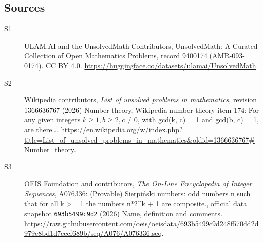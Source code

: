 \documentclass[11pt]{article}
\begin{document}
\subsection{Sources}
\begin{description}
\item[\hypertarget{source:9400174:1}{S1}] ULAM.AI and the UnsolvedMath Contributors, UnsolvedMath: A Curated Collection of Open Mathematics Problems, record 9400174 (AMR-093-0174). CC BY 4.0. \url{https://huggingface.co/datasets/ulamai/UnsolvedMath}.
\item[\hypertarget{source:9400174:2}{S2}] Wikipedia contributors, \emph{List of unsolved problems in mathematics}, revision 1366636767 (2026) Number theory, Wikipedia number-theory item 174: For any given integers $k\geq 1, b\geq 2, c\neq 0$, with gcd(k, c) = 1 and gcd(b, c) = 1, are there…. \url{https://en.wikipedia.org/w/index.php?title=List_of_unsolved_problems_in_mathematics&oldid=1366636767#Number_theory}.
\item[\hypertarget{source:9400174:3}{S3}] OEIS Foundation and contributors, \emph{The On-Line Encyclopedia of Integer Sequences}, A076336: (Provable) Sierpiński numbers: odd numbers n such that for all k >= 1 the numbers n*2\textasciicircum{}k + 1 are composite., official data snapshot \texttt{693b5499c9d2} (2026) Name, definition and comments. \url{https://raw.githubusercontent.com/oeis/oeisdata/693b5499c9d248f570dd2d979e8bd1d7eecf689b/seq/A076/A076336.seq}.
\end{description}
\label{end:9400174}
\end{document}

